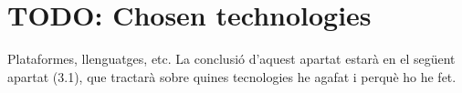 
\section{TODO: Chosen technologies}

Plataformes, llenguatges, etc. La conclusió d'aquest apartat estarà en el
següent apartat (3.1), que tractarà sobre quines tecnologies he agafat i perquè
ho he fet.
